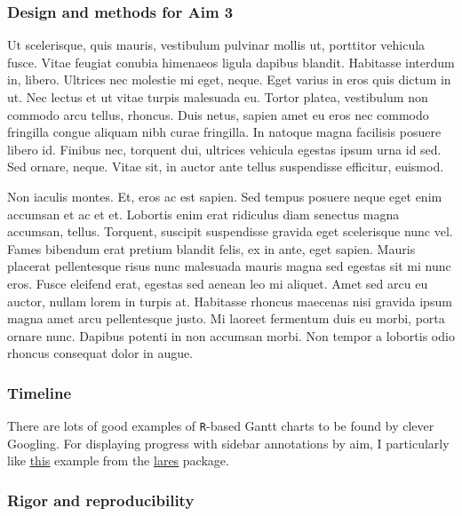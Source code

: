 \documentclass[11pt,]{article}
\begin{document}
\hypertarget{design-and-methods-for-aim-3}{%
\subsubsection{Design and methods for Aim
3}\label{design-and-methods-for-aim-3}}

Ut scelerisque, quis mauris, vestibulum pulvinar mollis ut, porttitor
vehicula fusce. Vitae feugiat conubia himenaeos ligula dapibus blandit.
Habitasse interdum in, libero. Ultrices nec molestie mi eget, neque.
Eget varius in eros quis dictum in ut. Nec lectus et ut vitae turpis
malesuada eu. Tortor platea, vestibulum non commodo arcu tellus,
rhoncus. Duis netus, sapien amet eu eros nec commodo fringilla congue
aliquam nibh curae fringilla. In natoque magna facilisis posuere libero
id. Finibus nec, torquent dui, ultrices vehicula egestas ipsum urna id
sed. Sed ornare, neque. Vitae sit, in auctor ante tellus suspendisse
efficitur, euismod.

Non iaculis montes. Et, eros ac est sapien. Sed tempus posuere neque
eget enim accumsan et ac et et. Lobortis enim erat ridiculus diam
senectus magna accumsan, tellus. Torquent, suscipit suspendisse gravida
eget scelerisque nunc vel. Fames bibendum erat pretium blandit felis, ex
in ante, eget sapien. Mauris placerat pellentesque risus nunc malesuada
mauris magna sed egestas sit mi nunc eros. Fusce eleifend erat, egestas
sed aenean leo mi aliquet. Amet sed arcu eu auctor, nullam lorem in
turpis at. Habitasse rhoncus maecenas nisi gravida ipsum magna amet arcu
pellentesque justo. Mi laoreet fermentum duis eu morbi, porta ornare
nunc. Dapibus potenti in non accumsan morbi. Non tempor a lobortis odio
rhoncus consequat dolor in augue.

\hypertarget{timeline}{%
\subsubsection{Timeline}\label{timeline}}

There are lots of good examples of \texttt{R}-based Gantt charts to be
found by clever Googling. For displaying progress with sidebar
annotations by aim, I particularly like
\href{https://datascienceplus.com/visualize-your-cvs-timeline-with-r-gantt-style/}{\underline{this}}
example from the
\href{https://github.com/laresbernardo/lares}{\underline{lares}}
package.

\hypertarget{rigor-and-reproducibility}{%
\subsubsection{Rigor and
reproducibility}\label{rigor-and-reproducibility}}
\end{document}
